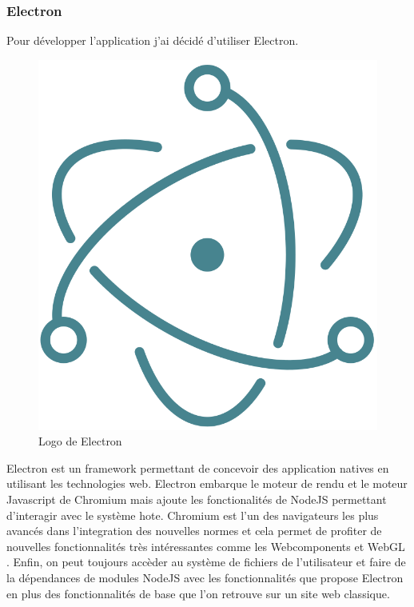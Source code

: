 \subsubsection{Electron}

Pour développer l'application j'ai décidé d'utiliser Electron.

\begin{figure}[h]
    \centering
    \includegraphics[scale=0.2]{img/electron.png}
    \caption{Logo de Electron}
\end{figure}

Electron est un framework permettant de concevoir des application natives en utilisant les technologies web.
Electron embarque le moteur de rendu et le moteur Javascript de Chromium mais ajoute les fonctionalités de NodeJS permettant d'interagir avec le système hote.
Chromium est l'un des navigateurs les plus avancés dans l'integration des nouvelles normes et cela permet de profiter de nouvelles fonctionnalités très intéressantes comme les Webcomponents et WebGL .
Enfin, on peut toujours accèder au système de fichiers de l'utilisateur et faire de la dépendances de modules NodeJS avec les fonctionnalités que propose Electron en plus des fonctionnalités de base que l'on retrouve sur un site web classique.

